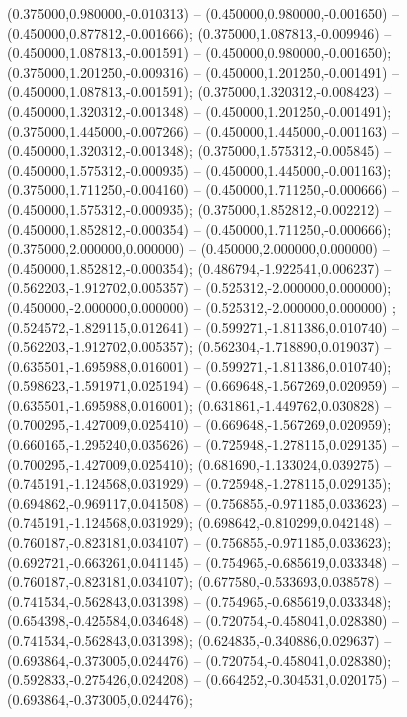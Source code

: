  (0.375000,0.980000,-0.010313) -- (0.450000,0.980000,-0.001650) -- (0.450000,0.877812,-0.001666);
 (0.375000,1.087813,-0.009946) -- (0.450000,1.087813,-0.001591) -- (0.450000,0.980000,-0.001650);
 (0.375000,1.201250,-0.009316) -- (0.450000,1.201250,-0.001491) -- (0.450000,1.087813,-0.001591);
 (0.375000,1.320312,-0.008423) -- (0.450000,1.320312,-0.001348) -- (0.450000,1.201250,-0.001491);
 (0.375000,1.445000,-0.007266) -- (0.450000,1.445000,-0.001163) -- (0.450000,1.320312,-0.001348);
 (0.375000,1.575312,-0.005845) -- (0.450000,1.575312,-0.000935) -- (0.450000,1.445000,-0.001163);
 (0.375000,1.711250,-0.004160) -- (0.450000,1.711250,-0.000666) -- (0.450000,1.575312,-0.000935);
 (0.375000,1.852812,-0.002212) -- (0.450000,1.852812,-0.000354) -- (0.450000,1.711250,-0.000666);
 (0.375000,2.000000,0.000000) -- (0.450000,2.000000,0.000000) -- (0.450000,1.852812,-0.000354);
 (0.486794,-1.922541,0.006237) -- (0.562203,-1.912702,0.005357) -- (0.525312,-2.000000,0.000000);
 (0.450000,-2.000000,0.000000) -- (0.525312,-2.000000,0.000000) ;
 (0.524572,-1.829115,0.012641) -- (0.599271,-1.811386,0.010740) -- (0.562203,-1.912702,0.005357);
 (0.562304,-1.718890,0.019037) -- (0.635501,-1.695988,0.016001) -- (0.599271,-1.811386,0.010740);
 (0.598623,-1.591971,0.025194) -- (0.669648,-1.567269,0.020959) -- (0.635501,-1.695988,0.016001);
 (0.631861,-1.449762,0.030828) -- (0.700295,-1.427009,0.025410) -- (0.669648,-1.567269,0.020959);
 (0.660165,-1.295240,0.035626) -- (0.725948,-1.278115,0.029135) -- (0.700295,-1.427009,0.025410);
 (0.681690,-1.133024,0.039275) -- (0.745191,-1.124568,0.031929) -- (0.725948,-1.278115,0.029135);
 (0.694862,-0.969117,0.041508) -- (0.756855,-0.971185,0.033623) -- (0.745191,-1.124568,0.031929);
 (0.698642,-0.810299,0.042148) -- (0.760187,-0.823181,0.034107) -- (0.756855,-0.971185,0.033623);
 (0.692721,-0.663261,0.041145) -- (0.754965,-0.685619,0.033348) -- (0.760187,-0.823181,0.034107);
 (0.677580,-0.533693,0.038578) -- (0.741534,-0.562843,0.031398) -- (0.754965,-0.685619,0.033348);
 (0.654398,-0.425584,0.034648) -- (0.720754,-0.458041,0.028380) -- (0.741534,-0.562843,0.031398);
 (0.624835,-0.340886,0.029637) -- (0.693864,-0.373005,0.024476) -- (0.720754,-0.458041,0.028380);
 (0.592833,-0.275426,0.024208) -- (0.664252,-0.304531,0.020175) -- (0.693864,-0.373005,0.024476);
